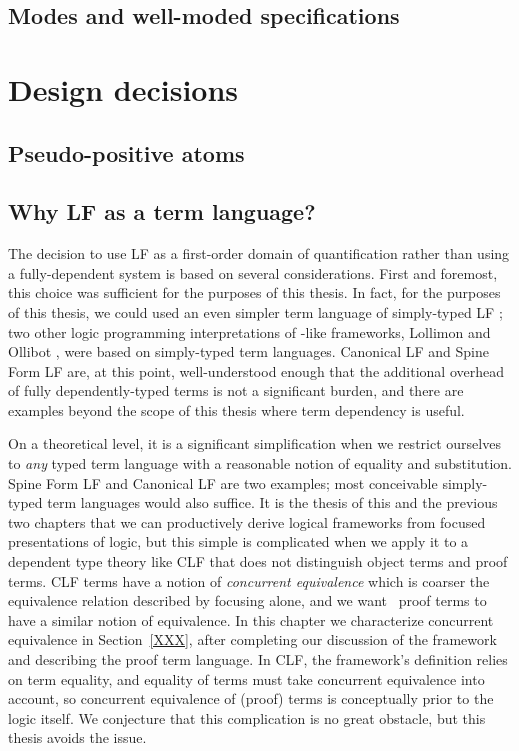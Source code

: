 \subsection{Modes and well-moded specifications}
\label{sec:framework-modes}

\section{Design decisions}

\subsection{Pseudo-positive atoms}
\label{sec:pseudopositive}


\subsection{Why LF as a term language?}
\label{sec:why-not-fully-dependent}

The decision to use LF as a first-order domain of quantification
rather than using a fully-dependent system is based on several
considerations. First and foremost, this choice was sufficient for the
purposes of this thesis. In fact, for the purposes of this thesis, we
could used an even simpler term language of simply-typed LF
\cite{pfenning08church}; two other logic programming interpretations
of \sls-like frameworks, Lollimon \cite{lopez05monadic} and Ollibot
\cite{pfenning09substructural}, were based on simply-typed term
languages. Canonical LF and Spine Form LF are, at this point,
well-understood enough that the additional overhead of fully
dependently-typed terms is not a significant burden, and there are
examples beyond the scope of this thesis where term dependency is
useful.

On a theoretical level, it is a significant simplification when we
restrict ourselves to {\it any} typed term language with a reasonable
notion of equality and substitution. Spine Form LF and Canonical LF
are two examples; most conceivable simply-typed term languages would
also suffice. It is the thesis of this and the previous two chapters
that we can productively derive logical frameworks from focused
presentations of logic, but this simple is complicated when we apply it
to a dependent type theory like CLF that does not distinguish object
terms and proof terms. CLF terms have a notion of {\it concurrent
  equivalence} which is coarser the equivalence relation described by
focusing alone, and we want \sls~proof terms to have a similar notion
of equivalence. In this chapter we characterize concurrent equivalence
in Section~\ref{XXX}, after completing our discussion of the framework
and describing the proof term language.  In CLF, the framework's
definition relies on term equality, and equality of terms must take
concurrent equivalence into account, so concurrent equivalence of
(proof) terms is conceptually prior to the logic itself. We conjecture
that this complication is no great obstacle, but this thesis avoids
the issue.

